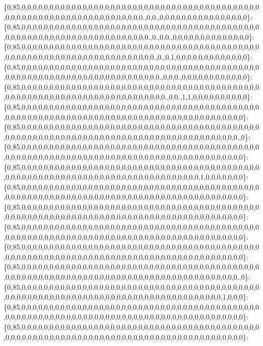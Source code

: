 \{0,85,0,0,0,0,0,0,0,0,0,0,0,0,0,0,0,0,0,0,0,0,0,0,0,0,0,0,0,0,0,0,0,0,0,0,0,0,0,0,0,0,0,0,0,0,0,0,0,0,0,0,0,0,0,0,0,0,0,0,0,0,0,0,0,0,0,0,0,0.,0,0.,0,0,0,0,0,0,0,0,0,0,0,0,0,0,0,0\}\+: \{0,85,0,0,0,0,0,0,0,0,0,0,0,0,0,0,0,0,0,0,0,0,0,0,0,0,0,0,0,0,0,0,0,0,0,0,0,0,0,0,0,0,0,0,0,0,0,0,0,0,0,0,0,0,0,0,0,0,0,0,0,0,0,0,0,0,0,0,0,0,0.,0.,0,0.,0,0,0,0,0,0,0,0,0,0,0,0,0,0\}\+: \{0,85,0,0,0,0,0,0,0,0,0,0,0,0,0,0,0,0,0,0,0,0,0,0,0,0,0,0,0,0,0,0,0,0,0,0,0,0,0,0,0,0,0,0,0,0,0,0,0,0,0,0,0,0,0,0,0,0,0,0,0,0,0,0,0,0,0,0,0,0,0,0.,0.,0,1,0,0,0,0,0,0,0,0,0,0,0,0,0\}\+: \{0,85,0,0,0,0,0,0,0,0,0,0,0,0,0,0,0,0,0,0,0,0,0,0,0,0,0,0,0,0,0,0,0,0,0,0,0,0,0,0,0,0,0,0,0,0,0,0,0,0,0,0,0,0,0,0,0,0,0,0,0,0,0,0,0,0,0,0,0,0,0,0,0.,0,0,0.,0,0,0,0,0,0,0,0,0,0,0,0\}\+: \{0,85,0,0,0,0,0,0,0,0,0,0,0,0,0,0,0,0,0,0,0,0,0,0,0,0,0,0,0,0,0,0,0,0,0,0,0,0,0,0,0,0,0,0,0,0,0,0,0,0,0,0,0,0,0,0,0,0,0,0,0,0,0,0,0,0,0,0,0,0,0,0,0,0.,0,0.,1,1,0,0,0,0,0,0,0,0,0,0\}\+: \{0,85,0,0,0,0,0,0,0,0,0,0,0,0,0,0,0,0,0,0,0,0,0,0,0,0,0,0,0,0,0,0,0,0,0,0,0,0,0,0,0,0,0,0,0,0,0,0,0,0,0,0,0,0,0,0,0,0,0,0,0,0,0,0,0,0,0,0,0,0,0,0,0,0,0,0,0,0,0,0,0,0,0,0,0,0,0,0\}\+: \{0,85,0,0,0,0,0,0,0,0,0,0,0,0,0,0,0,0,0,0,0,0,0,0,0,0,0,0,0,0,0,0,0,0,0,0,0,0,0,0,0,0,0,0,0,0,0,0,0,0,0,0,0,0,0,0,0,0,0,0,0,0,0,0,0,0,0,0,0,0,0,0,0,0,0,0,0,0,0,0,0,0,0,0,0,0,0.,0\}\+: \{0,85,0,0,0,0,0,0,0,0,0,0,0,0,0,0,0,0,0,0,0,0,0,0,0,0,0,0,0,0,0,0,0,0,0,0,0,0,0,0,0,0,0,0,0,0,0,0,0,0,0,0,0,0,0,0,0,0,0,0,0,0,0,0,0,0,0,0,0,0,0,0,0,0,0,0,0,0,0,0,0,0,0,0,0,0,0,0\}\+: \{0,85,0,0,0,0,0,0,0,0,0,0,0,0,0,0,0,0,0,0,0,0,0,0,0,0,0,0,0,0,0,0,0,0,0,0,0,0,0,0,0,0,0,0,0,0,0,0,0,0,0,0,0,0,0,0,0,0,0,0,0,0,0,0,0,0,0,0,0,0,0,0,0,0,0,0,0,0,0,0,1,0,0,0,0,0,0,0\}\+: \{0,85,0,0,0,0,0,0,0,0,0,0,0,0,0,0,0,0,0,0,0,0,0,0,0,0,0,0,0,0,0,0,0,0,0,0,0,0,0,0,0,0,0,0,0,0,0,0,0,0,0,0,0,0,0,0,0,0,0,0,0,0,0,0,0,0,0,0,0,0,0,0,0,0,0,0,0,0,0,0,0,0,0,0,0,0,0,0\}\+: \{0,85,0,0,0,0,0,0,0,0,0,0,0,0,0,0,0,0,0,0,0,0,0,0,0,0,0,0,0,0,0,0,0,0,0,0,0,0,0,0,0,0,0,0,0,0,0,0,0,0,0,0,0,0,0,0,0,0,0,0,0,0,0,0,0,0,0,0,0,0,0,0,0,0,0,0,0,0,0,0,0,0,0,0,0,0,0,0\}\+: \{0,85,0,0,0,0,0,0,0,0,0,0,0,0,0,0,0,0,0,0,0,0,0,0,0,0,0,0,0,0,0,0,0,0,0,0,0,0,0,0,0,0,0,0,0,0,0,0,0,0,0,0,0,0,0,0,0,0,0,0,0,0,0,0,0,0,0,0,0,0,0,0,0,0,0,0,0,0,0,0,0,0,0,0,0,0,0,0\}\+: \{0,85,0,0,0,0,0,0,0,0,0,0,0,0,0,0,0,0,0,0,0,0,0,0,0,0,0,0,0,0,0,0,0,0,0,0,0,0,0,0,0,0,0,0,0,0,0,0,0,0,0,0,0,0,0,0,0,0,0,0,0,0,0,0,0,0,0,0,0,0,0,0,0,0,0,0,0,0,0,0,0,0,0,0,0,0,0,0\}\+: \{0,85,0,0,0,0,0,0,0,0,0,0,0,0,0,0,0,0,0,0,0,0,0,0,0,0,0,0,0,0,0,0,0,0,0,0,0,0,0,0,0,0,0,0,0,0,0,0,0,0,0,0,0,0,0,0,0,0,0,0,0,0,0,0,0,0,0,0,0,0,0,0,0,0,0,0,0,0,0,0,0,0,0,0,0,0,0.,0\}\+: \{0,85,0,0,0,0,0,0,0,0,0,0,0,0,0,0,0,0,0,0,0,0,0,0,0,0,0,0,0,0,0,0,0,0,0,0,0,0,0,0,0,0,0,0,0,0,0,0,0,0,0,0,0,0,0,0,0,0,0,0,0,0,0,0,0,0,0,0,0,0,0,0,0,0,0,0,0,0,0,0,0,0,0,0,1,0,0,0\}\+: \{0,85,0,0,0,0,0,0,0,0,0,0,0,0,0,0,0,0,0,0,0,0,0,0,0,0,0,0,0,0,0,0,0,0,0,0,0,0,0,0,0,0,0,0,0,0,0,0,0,0,0,0,0,0,0,0,0,0,0,0,0,0,0,0,0,0,0,0,0,0,0,0,0,0,0,0,0,0,0,0,0,0,0,0,0,0,0,0\}\+: \{0,85,0,0,0,0,0,0,0,0,0,0,0,0,0,0,0,0,0,0,0,0,0,0,0,0,0,0,0,0,0,0,0,0,0,0,0,0,0,0,0,0,0,0,0,0,0,0,0,0,0,0,0,0,0,0,0,0,0,0,0,0,0,0,0,0,0,0,0,0,0,0,0,0,0,0,0,0,0,0,0,0,0,0,0,0,0,0\}\+: 
